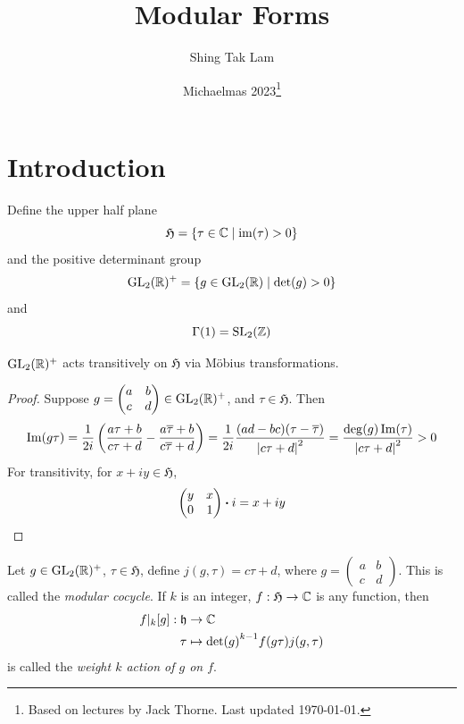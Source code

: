 \documentclass{article}
\title{Modular Forms}
\author{Shing Tak Lam}
\date{Michaelmas 2023\footnote{Based on lectures by Jack Thorne. Last updated \today.}}
\newcommand{\mfH}{\mathfrak{H}}
\begin{document}
\maketitle

\tableofcontents

\lec

\section{Introduction}

\begin{definition}
    Define the upper half plane
    \[\mfH = \left\{\tau \in \C \mid \im(\tau) > 0\right\}\]
    and the positive determinant group
    \[\operatorname{GL}_2(\mathbb{R})^+ = \left\{g \in \operatorname{GL}_2(\mathbb{R}) \mid \det(g) > 0\right\}\]
    and
    \[\Gamma(1) = \operatorname{SL}_2(\mathbb{Z})\]
\end{definition}

\begin{lemma}
    \(\operatorname{GL}_2(\mathbb{R})^+\) acts transitively on \(\mfH\) via M\"obius transformations.
\end{lemma}

\begin{proof}
    Suppose \(g = \begin{pmatrix}
        a & b \\ c & d
    \end{pmatrix} \in \operatorname{GL}_2(\mathbb{R})^+\), and \(\tau \in \mfH\). Then
    \[\Im(g\tau) = \frac{1}{2i}\left(\frac{a\tau + b}{c\tau + d} - \frac{a\overline\tau + b}{c\overline\tau + d}\right) = \frac{1}{2i}\frac{(ad - bc)(\tau - \overline \tau)}{\abs{c\tau + d}^2} = \frac{\deg(g)\Im(\tau)}{\abs{c\tau + d}^2} > 0\]
    For transitivity, for \(x + iy \in \mfH\),
    \[\begin{pmatrix}
        y & x \\ 0 & 1
    \end{pmatrix} \vdot i = x + iy\]
\end{proof}

\begin{definition}
    Let \(g \in \operatorname{GL}_2(\mathbb{R})^+\), \(\tau \in \mfH\), define \(j(g, \tau) = c\tau + d\), where \(g = \begin{pmatrix}
        a & b \\ c & d
    \end{pmatrix}\). This is called the \emph{modular cocycle}. If \(k\) is an integer, \(f : \mfH \to \C\) is any function, then
    \begin{align*}
        f\vert_k[g] : \mathfrak{h} &\to \mathbb{C} \\
        \tau &\mapsto \det(g)^{k-1}f(g\tau)j(g, \tau)
    \end{align*}
    is called the \emph{weight \(k\) action of \(g\) on \(f\)}.
\end{definition}
\end{document}
